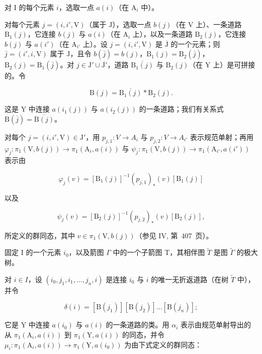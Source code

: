 对 I 的每个元素 \(i\)，选取一点 \(a(i)\)（在 \(\mathrm{A}_i\) 中）。

对每个元素 \(j = (i, i', \mathrm{V})\)（属于 \(\mathrm{J}\)），选取一点 \(b(j)\)（在 \(\mathrm{V}\) 上）、一条道路 \(\mathrm{B}_1(j)\)，它连接 \(b(j)\) 与 \(a(i)\)（在 \(\mathrm{A}_i\) 上），以及一条道路 \(\mathrm{B}_2(j)\)，它连接 \(b(j)\) 与 \(a(i')\)（在 \(\mathrm{A}_{i'}\) 上）。设 \(j = (i, i', \mathrm{V})\) 是 \(\overline{\mathrm{J}}\) 的一个元素；则 \(\overline{j} = (i', i, \mathrm{V})\) 属于 \(\mathrm{J}\)，且令 \(b(\overline{j}) = b(j)\)，\(\mathrm{B}_1(j) = \mathrm{B}_2(\overline{j})\)，\(\mathrm{B}_2(j) = \mathrm{B}_1(\overline{j})\)。对 \(j \in \mathrm{J}' \cup \overline{\mathrm{J}'}\)，道路 \(\overline{\mathrm{B}_1(j)}\) 与 \(\mathrm{B}_2(j)\)（在 \(\mathrm{Y}\) 上）是可拼接的。令

\[
\mathrm{B} (j) = \overline {{\mathrm{B} _ {1} (j)}} * \mathrm{B} _ {2} (j).\tag{3}
\]

这是 Y 中连接 \(a(i_1(j))\) 与 \(a(i_2(j))\) 的一条道路；我们有关系式 \(\mathrm{B}(\overline{j}) = \overline{\mathrm{B}(j)}\)。

对每个 \(j = (i, i', \mathrm{V}) \in \mathrm{J}'\)，用 \(p_{j,1} \colon V \to A_i\) 与 \(p_{j,2} \colon V \to A_{i'}\) 表示规范单射；再用 \(\varphi_j \colon \pi_1(\mathrm{V}, b(j)) \to \pi_1(\mathrm{A}_i, a(i))\) 与 \(\psi_j \colon \pi_1(\mathrm{V}, b(j)) \to \pi_1(\mathrm{A}_{i'}, a(i'))\) 表示由

\[
\varphi_ {j} (v) = [ \mathrm{B} _ {1} (j) ] ^ {- 1} (p _ {j, 1}) _ {*} (v) [ \mathrm{B} _ {1} (j) ]
\]

以及

\[
\psi_ {j} (v) = [ \mathrm{B} _ {2} (j) ] ^ {- 1} (p _ {j, 2}) _ {*} (v) [ \mathrm{B} _ {2} (j) ],
\]

所定义的群同态，其中 \(v \in \pi_1(\mathrm{V}, b(j))\)（参见 IV, 第~407~页）。

固定 I 的一个元素 \(i_0\)，以及箭图 \(\Gamma\) 中的一个子箭图 T，其相伴图 \(\widetilde{T}\) 是图 \(\widetilde{\Gamma}\) 的极大树。

对 \(i \in I\)，设 \((i_0, j_1, i_1, \ldots, j_n, i)\) 是连接 \(i_0\) 与 \(i\) 的唯一无折返道路（在树 \(\widetilde{T}\) 中），并令

\[
\delta (i) = \left[ \mathrm{B} \left(j _ {1}\right) \right] \left[ \mathrm{B} \left(j _ {2}\right) \right] \dots \left[ \mathrm{B} \left(j _ {n}\right) \right];
\]

它是 Y 中连接 \(a(i_0)\) 与 \(a(i)\) 的一条道路的类。用 \(\alpha_i\) 表示由规范单射导出的从 \(\pi_1(\mathrm{A}_i, a(i))\) 到 \(\pi_1(\mathrm{Y}, a(i))\) 的同态，并令 \(\mu_i: \pi_1(\mathrm{A}_i, a(i)) \to \pi_1(\mathrm{Y}, a(i_0))\) 为由下式定义的群同态：

